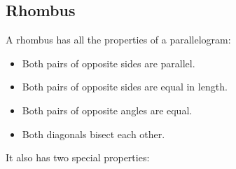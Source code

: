 \subsection{Rhombus}
\par

A rhombus has all the properties of a parallelogram:
\begin{itemize}[noitemsep]
\item Both pairs of opposite sides are parallel.
\item Both pairs of opposite sides are equal in length.
\item Both pairs of opposite angles are equal.
\item Both diagonals bisect each other.
\end{itemize}

It also has two special properties:


